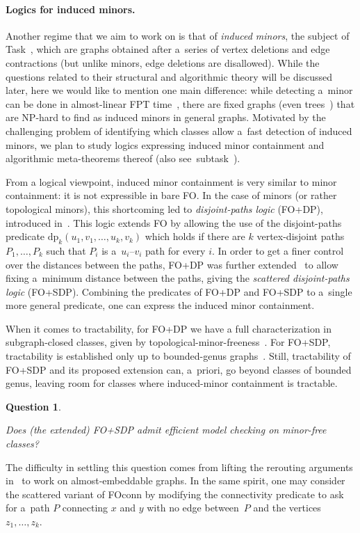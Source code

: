 \documentclass[a4paper,11pt]{article}
\newcommand{\fo}{\textsf{FO}\xspace}
\newcommand{\fodp}{\textsf{FO+DP}\xspace}
\newcommand{\fosdp}{\textsf{FO+SDP}\xspace}
\newcommand{\foconn}{\textsf{FO\text{+}conn}\xspace}
\newtheorem{quest}{Question}
\newenvironment{question}
  {\begin{quest}\begin{mdframed}[style=questionstyle]}
  {\end{mdframed}\end{quest}}
\begin{document}
\paragraph{Logics for induced minors.}
Another regime that we aim to work on is that of \emph{induced minors}, the subject of Task~, which are graphs obtained after a~series of vertex deletions and edge contractions (but unlike minors, edge deletions are disallowed).
While the questions related to their structural and algorithmic theory will be discussed later, here we would like to mention one main difference:
while detecting a~minor can be done in almost-linear FPT time~\cite{KorhonenPS24}, there are fixed graphs (even trees~\cite{KorhonenL24}) that are NP-hard to find as induced minors in general graphs.
Motivated by the challenging problem of identifying which classes allow a~fast detection of induced minors, we plan to study logics expressing induced minor containment and algorithmic meta-theorems thereof (also see~subtask~).

From a logical viewpoint, induced minor containment is very similar to minor containment: it is not expressible in bare \fo.
In the case of minors (or rather topological minors), this shortcoming led to \emph{disjoint-paths logic} (\fodp), introduced in~\cite{SchirrmacherSV22first}.
This logic extends \fo by allowing the use of the disjoint-paths predicate $\text{dp}_k(u_1,v_1, \ldots, u_k,v_k)$ which holds if there are $k$ vertex-disjoint paths $P_1,\ldots, P_k$ such that $P_i$ is \mbox{a~$u_i$--$v_i$} path for every $i$.
In order to get a finer control over the distances between the paths, \fodp was further extended~\cite{GolovachST23} to allow fixing a~minimum distance between the paths, giving the \emph{scattered disjoint-paths logic} (\fosdp).
Combining the predicates of \fodp and \fosdp to a~single more general predicate, one can express the induced minor containment.

When it comes to tractability, for \fodp we have a full characterization in subgraph-closed classes, given by topological-minor-freeness~\cite{SchirrmacherSSTV24mode}. For \fosdp, tractability is established only up to bounded-genus graphs~\cite{GolovachST23}.
Still, tractability of \fosdp and its proposed extension can, a~priori, go beyond classes of bounded genus, leaving room for classes where induced-minor containment is tractable.

\begin{question}\label{question:fosdp}
    Does (the extended) \fosdp admit efficient model checking on minor-free classes?
\end{question}
The difficulty in settling this question comes from lifting the rerouting arguments in~\cite{GolovachST23} to work on almost-embeddable graphs.
In the same spirit, one may consider the scattered variant of \foconn by modifying the connectivity predicate to ask for a~path $P$ connecting $x$ and $y$ with no edge between~$P$ and the vertices $z_1,\ldots,z_k$. 
\end{document}

